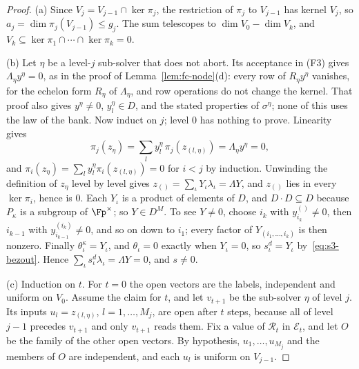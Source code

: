 \begin{proof}
(a) Since $V_j = V_{j-1} \cap \ker\pi_j$, the restriction of $\pi_j$ to $V_{j-1}$ has kernel $V_j$, so $a_j = \dim\pi_j(V_{j-1}) \le g_j$. The sum telescopes to $\dim V_0 - \dim V_k$, and $V_k \subseteq \ker\pi_1\cap\cdots\cap\ker\pi_k = 0$.

(b) Let $\eta$ be a level-$j$ sub-solver that does not abort. Its acceptance in (F3) gives $\Lambda_\eta y^\eta = 0$, as in the proof of Lemma~\ref{lem:fc-node}(d): every row of $R_\eta y^\eta$ vanishes, for the echelon form $R_\eta$ of $\Lambda_\eta$, and row operations do not change the kernel. That proof also gives $y^\eta \ne 0$, $y^\eta_l \in D$, and the stated properties of $\sigma^\eta$; none of this uses the law of the bank. Now induct on $j$; level $0$ has nothing to prove. Linearity gives
\[
  \pi_j(z_\eta) = \sum_{l} y^\eta_l\,\pi_j(z_{(l,\eta)}) = \Lambda_\eta y^\eta = 0,
\]
and $\pi_i(z_\eta) = \sum_l y^\eta_l\pi_i(z_{(l,\eta)}) = 0$ for $i < j$ by induction. Unwinding the definition of $z_\eta$ level by level gives $z_{()} = \sum_\iota Y_\iota\lambda_\iota = \Lambda Y$, and $z_{()}$ lies in every $\ker\pi_i$, hence is $0$. Each $Y_\iota$ is a product of elements of $D$, and $D\cdot D \subseteq D$ because $P_\kappa$ is a subgroup of $\Fp^\times$; so $Y \in D^M$. To see $Y \ne 0$, choose $i_k$ with $y^{()}_{i_k} \ne 0$, then $i_{k-1}$ with $y^{(i_k)}_{i_{k-1}} \ne 0$, and so on down to $i_1$; every factor of $Y_{(i_1,\dots,i_k)}$ is then nonzero. Finally $\theta_\iota^\kappa = Y_\iota$, and $\theta_\iota = 0$ exactly when $Y_\iota = 0$, so $s_\iota^d = Y_\iota$ by~\eqref{eq:s3-bezout}. Hence $\sum_\iota s_\iota^d\lambda_\iota = \Lambda Y = 0$, and $s \ne 0$.

(c) Induction on $t$. For $t = 0$ the open vectors are the labels, independent and uniform on $V_0$. Assume the claim for $t$, and let $v_{t+1}$ be the sub-solver $\eta$ of level $j$. Its inputs $u_l = z_{(l,\eta)}$, $l = 1,\dots,M_j$, are open after $t$ steps, because all of level $j-1$ precedes $v_{t+1}$ and only $v_{t+1}$ reads them. Fix a value of $\mathcal{R}_t$ in $\mathcal{E}_t$, and let $O$ be the family of the other open vectors. By hypothesis, $u_1,\dots,u_{M_j}$ and the members of $O$ are independent, and each $u_l$ is uniform on $V_{j-1}$.


\end{proof}
